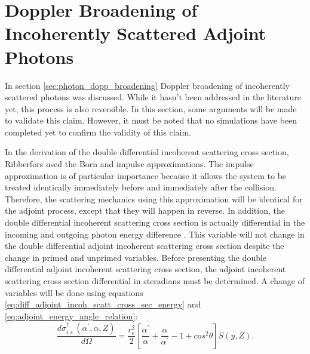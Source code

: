 \section{Doppler Broadening of Incoherently Scattered Adjoint Photons}
In section \ref{sec:photon_dopp_broadening} Doppler broadening of incoherently
scattered photons was discussed. While it hasn't been addressed in the 
literature yet, this process is also reversible. In this section, some 
arguments will be made to validate this claim. However, it must be noted that
no simulations have been completed yet to confirm the validity of this claim. 

In the derivation of the double differential incoherent scattering cross 
section, Ribberfors used the Born and impulse approximations. The impulse 
approximation is of particular importance because it allows the system to be
treated identically immediately before and immediately after the collision.
Therefore, the scattering mechanics using this approximation will be identical
for the adjoint process, except that they will happen in reverse. In addition,
the double differential incoherent scattering cross section is actually
differential in the incoming and outgoing photon energy difference 
\citep{cooper_compton_1985}. This variable will not change in the double 
differential adjoint incoherent scattering cross section despite the change in
primed and unprimed variables. Before presenting the double differential
adjoint incoherent scattering cross section, the adjoint incoherent scattering
cross section differential in steradians must be determined. A change of 
variables will be done using equations 
\ref{eq:diff_adjoint_incoh_scatt_cross_sec_energy} and 
\ref{eq:adjoint_energy_angle_relation}:
\begin{equation}
  \frac{d\sigma_{i.s.}^{\dagger}(\alpha^{'},\alpha,Z)}{d\Omega} = 
  \frac{r_e^2}{2}\left[\frac{\alpha^{'}}{\alpha} + \frac{\alpha}{\alpha^{'}} - 1
    + cos^2\theta \right]S(y,Z).
  \label{eq:diff_adjoint_incoh_cross_sec_steradian}
\end{equation}

